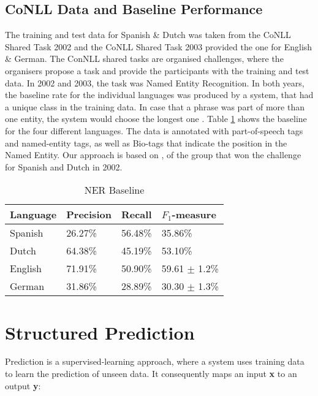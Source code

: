 \documentclass[11pt]{article}
\begin{document}
\subsection{CoNLL Data and Baseline Performance}
The training and test data for Spanish \& Dutch was taken from the CoNLL Shared Task 2002 \cite{tksintro} and 
the CoNLL Shared Task 2003 \cite{TjongKimSang:2003:ICS:1119176.1119195} provided the one for English \& German.
The ConNLL shared tasks are organised challenges, where the organisers propose a task and provide the participants with the
training and test data. 
In 2002 and 2003, the task was Named Entity Recognition. 
In both years, the baseline rate for the individual languages was produced by a system, that had a unique class in the training data. 
In case that a phrase was part of more than one entity, the system would choose the longest one \cite{TjongKimSang:2003:ICS:1119176.1119195}. 
Table \ref{table:Base} shows the baseline for the four different languages.  
The data is annotated with part-of-speech tags and named-entity tags, as well as Bio-tags that indicate the position in the Named Entity. %
Our approach is based on \cite{strlearn}, of the group that won the challenge for Spanish and Dutch in 2002. 


\begin{table}[h!]
\scriptsize
\begin{tabular}{|l|l|l|l|}
\hline
\bf Language & \bf Precision & \bf Recall & \bf $F_1$-measure \\ \hline
Spanish &             26.27\% & 56.48\% & 35.86\%        \\
Dutch  &             64.38\%  &45.19\%    & 53.10\%  \\
English &              71.91\%& 50.90\%  & 59.61 $\pm$ 1.2\%\\
German &      31.86\%  & 28.89\% & 30.30  $\pm$ 1.3\% \\
\hline
\end{tabular}
\caption{NER Baseline}
\label{table:Base}
\end{table}

\section{Structured Prediction}
Prediction \cite{Taskar:2005:LSP:1102351.1102464} is a supervised-learning approach, where a system uses training data to learn the prediction
of unseen data. It consequently maps an input \textbf{x} to an output \textbf{y}: \\
\end{document}
